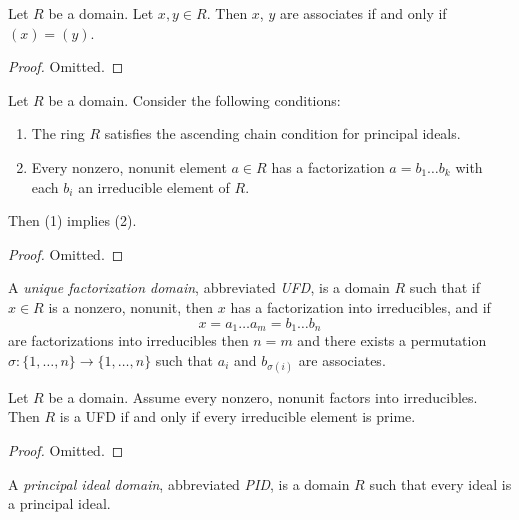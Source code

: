 \begin{lemma}
\label{lemma-easy-divisibility}
Let $R$ be a domain.
Let $x, y \in R$.
Then $x$, $y$ are associates if and only if $(x) = (y)$.
\end{lemma}

\begin{proof}
Omitted.
\end{proof}

\begin{lemma}
\label{lemma-factorization-exists}
Let $R$ be a domain. Consider the following conditions:
\begin{enumerate}
\item The ring $R$ satisfies the ascending chain condition for
principal ideals.
\item Every nonzero, nonunit element $a \in R$
has a factorization $a = b_1 \ldots b_k$
with each $b_i$ an irreducible element of $R$.
\end{enumerate}
Then (1) implies (2).
\end{lemma}

\begin{proof}
Omitted.
\end{proof}

\begin{definition}
\label{definition-UFD}
A {\it unique factorization domain}, abbreviated {\it UFD},
is a domain $R$ such that
if $x \in R$ is a nonzero, nonunit, then $x$ has a factorization
into irreducibles, and if
$$
x = a_1 \ldots a_m = b_1 \ldots b_n
$$
are factorizations into irreducibles then $n = m$ and
there exists a permutation $\sigma : \{1, \ldots, n\} \to \{1, \ldots, n\}$
such that $a_i$ and $b_{\sigma(i)}$ are associates.
\end{definition}

\begin{lemma}
\label{lemma-characterize-UFD}
Let $R$ be a domain. Assume every nonzero, nonunit factors into
irreducibles. Then $R$ is a UFD if and only if every irreducible
element is prime.
\end{lemma}

\begin{proof}
Omitted.
\end{proof}

\begin{definition}
\label{definition-PID}
A {\it principal ideal domain}, abbreviated {\it PID},
is a domain $R$ such that every ideal is a principal ideal.
\end{definition}

